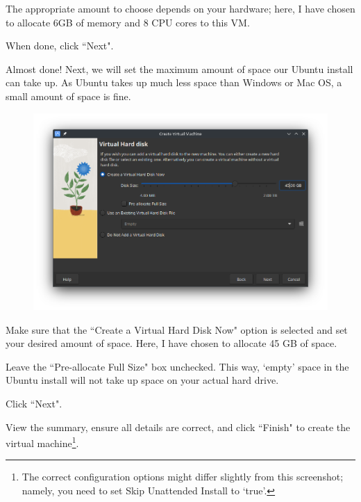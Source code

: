 \documentclass[12pt]{article}
\begin{document}
The appropriate amount to choose depends on your hardware; here, I have chosen to allocate 6GB of memory and 8 CPU cores to this VM.

When done, click ``Next".

\pagebreak

Almost done! Next, we will set the maximum amount of space our Ubuntu install can take up. As Ubuntu takes up much less space than Windows or Mac OS, a small amount of space is fine. 

\begin{figure}[htp]
    \centering
    \includegraphics[width=\textwidth]{1-7.png}
\end{figure}

Make sure that the ``Create a Virtual Hard Disk Now" option is selected and set your desired amount of space. Here, I have chosen to allocate 45 GB of space.

Leave the ``Pre-allocate Full Size" box unchecked. This way, `empty' space in the Ubuntu install will not take up space on your actual hard drive.

Click ``Next".

\pagebreak

View the summary, ensure all details are correct, and click ``Finish" to create the virtual machine\footnote{The correct configuration options might differ slightly from this screenshot; namely, you need to set Skip Unattended Install to `true'.}.
\end{document}
